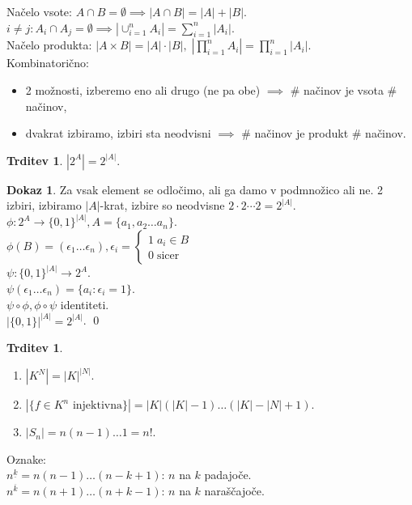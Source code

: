 \documentclass[a4paper, 12pt]{book}
\theoremstyle{definition}
\newtheorem{claim}[counter]{Trditev}
\newtheorem{pro}[counter]{Dokaz}
\theoremstyle{remark}
\begin{document}
Načelo vsote: $A \cap B = \emptyset \implies |A \cap B| = |A| + |B|$. \\
$i \neq j: A_i \cap A_j = \emptyset \implies |\cup_{i=1}^{n} A_i| = \sum_{i=1}^n |A_i|$. \\
Načelo produkta: $|A \times B| = |A| \cdot |B|, \; |\prod_{i=1}^n A_i| = \prod_{i=1}^{n} |A_i|$. \\
Kombinatorično:
\begin{itemize}[label={}]
  \item 2 možnosti, izberemo eno ali drugo (ne pa obe) $\implies$ \# načinov je vsota \# načinov,
  \item dvakrat izbiramo, izbiri sta neodvisni $\implies$ \# načinov je produkt \# načinov.
\end{itemize}
\begin{claim}
  $|2^A| = 2^{|A|}$.
\end{claim}
\begin{pro}
  Za vsak element se odločimo, ali ga damo v podmnožico ali ne.
  2 izbiri, izbiramo $|A|$-krat, izbire so neodvisne $2 \cdot 2 \cdots 2 = 2^{|A|}$. \\
  $\phi: 2^A \to \{0,1\}^{|A|}, A = \{a_1, a_2 \dots a_n\}$. \\
  $\phi(B) = (\epsilon_1 \dots \epsilon_n), \epsilon_i = \begin{cases}
      1 \; a_i \in B \\
      0 \; \text{sicer}
    \end{cases}$ \\
  $\psi: \{0,1\}^{|A|} \to 2^A$. \\
  $\psi(\epsilon_1 \dots \epsilon_n) = \{a_i: \epsilon_i = 1\}$. \\
  $\psi \circ \phi, \phi \circ \psi$ identiteti. \\
  $|\{0,1\}|^{|A|} = 2^{|A|}$.
  \qed
\end{pro}
\begin{claim} \text{}
  \begin{enumerate}
    \item $|K^N| = |K|^{|N|}$.
    \item $|\{f \in K^n \text{ injektivna}\}| = |K| (|K|-1) \dots (|K|-|N|+1)$.
    \item $|S_n| = n (n-1) \dots 1 = n!$.
  \end{enumerate}
\end{claim}
Oznake: \\
$n^{\underline{k}} = n (n-1) \dots (n-k+1)$: $n$ na $k$ padajoče. \\
$n^{\overline{k}} = n (n+1) \dots (n+k-1)$: $n$ na $k$ naraščajoče.
\end{document}
